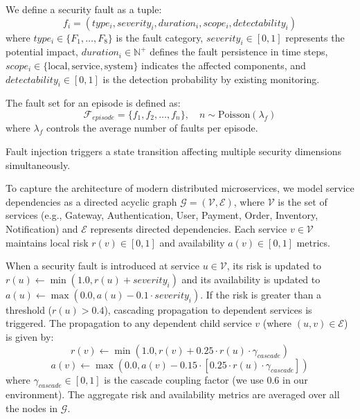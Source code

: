 \documentclass[pdflatex,sn-mathphys-num]{sn-jnl}%
\theoremstyle{thmstyleone}%
\theoremstyle{thmstyletwo}%
\theoremstyle{thmstylethree}%
\begin{document}
	We define a security fault as a tuple:
	\begin{equation}
		f_i = (type_i, severity_i, duration_i, scope_i, detectability_i)
	\end{equation}
	where $type_i \in \{F_1, \ldots, F_8\}$ is the fault category, $severity_i \in [0, 1]$ represents the potential impact, $duration_i \in \mathbb{N}^+$ defines the fault persistence in time steps, $scope_i \in \{\text{local}, \text{service}, \text{system}\}$ indicates the affected components, and $detectability_i \in [0, 1]$ is the detection probability by existing monitoring.
	
	The fault set for an episode is defined as:
	\begin{equation}
		\mathcal{F}_{episode} = \{f_1, f_2, \ldots, f_n\}, \quad n \sim \text{Poisson}(\lambda_f)
	\end{equation}
	where $\lambda_f$ controls the average number of faults per episode.
	
	Fault injection triggers a state transition affecting multiple security dimensions simultaneously.
	
	To capture the architecture of modern distributed microservices, we model service dependencies as a directed acyclic graph $\mathcal{G} = (\mathcal{V}, \mathcal{E})$, where $\mathcal{V}$ is the set of services (e.g., Gateway, Authentication, User, Payment, Order, Inventory, Notification) and $\mathcal{E}$ represents directed dependencies. Each service $v \in \mathcal{V}$ maintains local risk $r(v) \in [0, 1]$ and availability $a(v) \in [0, 1]$ metrics.
	
	When a security fault is introduced at service $u \in \mathcal{V}$, its risk is updated to $r(u) \leftarrow \min(1.0, r(u) + severity_i)$ and its availability is updated to $a(u) \leftarrow \max(0.0, a(u) - 0.1 \cdot severity_i)$. If the risk is greater than a threshold ($r(u) > 0.4$), cascading propagation to dependent services is triggered. The propagation to any dependent child service $v$ (where $(u, v) \in \mathcal{E}$) is given by: 
	\begin{equation}
		r(v) \leftarrow \min\left(1.0, r(v) + 0.25 \cdot r(u) \cdot \gamma_{cascade}\right)
	\end{equation}
	\begin{equation}
		a(v) \leftarrow \max\left(0.0, a(v) - 0.15 \cdot \left[0.25 \cdot r(u) \cdot \gamma_{cascade}\right]\right)
	\end{equation}
	where $\gamma_{cascade} \in [0, 1]$ is the cascade coupling factor (we use $0.6$ in our environment). The aggregate risk and availability metrics are averaged over all the nodes in $\mathcal{G}$. 
	
\end{document}
